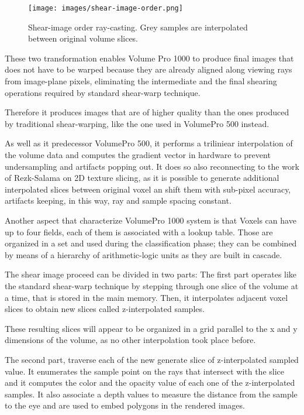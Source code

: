 \documentclass[12pt,a4paper]{extarticle}
\newcommand{\linespace}{\vspace{8pt}}
\begin{document}
\begin{figure}[hbtp]
\centering
\texttt{[image: images/shear-image-order.png]}
\caption{Shear-image order ray-casting. Grey samples are interpolated between original volume slices.}
\label{fig:shearimageorder}
\end{figure}


These two transformation enables Volume Pro 1000 to produce final images that does not have to be warped because they are already aligned along viewing rays from image-plane pixels, eliminating the intermediate and the final shearing operations required by standard shear-warp technique. 

Therefore it produces images that are of higher quality than the ones produced by traditional shear-warping, like the one used in VolumePro 500 instead. %
\linespace

As well as it predecessor VolumePro 500, it performs a triliniear interpolation of the volume data and computes the gradient vector in hardware to prevent undersampling and artifacts popping out. It does so also reconnecting to the work of Rezk-Salama on 2D texture slicing, as it is possible to generate additional interpolated slices between original voxel an shift them with sub-pixel accuracy, artifacts keeping, in this way, ray and sample spacing constant. %


Another aspect that characterize VolumePro 1000 system is that Voxels can have up to four fields, each of them is associated with a lookup table. Those are organized in a set and used during the classification phase; they can be combined by means of a hierarchy of arithmetic-logic units as they are built in cascade.
\linespace

The shear image proceed can be divided in two parts: The first part operates like the standard shear-warp technique by stepping through one slice of the volume at a time, that is stored in the main memory. Then, it interpolates adjacent voxel slices to obtain new slices called z-interpolated samples. 

These resulting slices will appear to be organized in a grid parallel to the x and y dimensions of the volume, as no other interpolation took place before.
\linespace

The second part, traverse each of the new generate slice of z-interpolated sampled value. It enumerates the sample point on the rays that intersect with the slice and it computes the color and the opacity value of each one of the z-interpolated samples. It also associate a depth values to measure the distance from the sample to the eye and are used to embed polygons in the rendered images.
\end{document}
